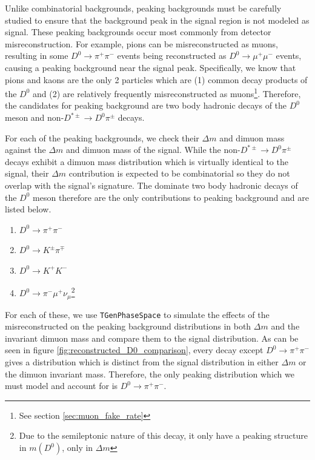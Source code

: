 Unlike combinatorial backgrounds, peaking backgrounds must be carefully studied to ensure that the background peak in the signal region is not modeled as signal. These peaking backgrounds occur most commonly from detector misreconstruction. For example, pions can be misreconstructed as muons, resulting in some $D^0 \to \pi^+ \pi^-$ events being reconstructed as $D^0 \to \mu^+ \mu^-$ events, causing a peaking background near the signal peak. Specifically, we know that pions and kaons are the only 2 particles which are (1) common decay products of the $D^0$ and (2) are relatively frequently misreconstructed as muons\footnote{See section \ref{sec:muon_fake_rate}}. Therefore, the candidates for peaking background are two body hadronic decays of the $D^0$ meson and non-$D^{*\pm} \to D^0 \pi^\pm$ decays. 

For each of the peaking backgrounds, we check their $\Delta m$ and dimuon mass against the $\Delta m$ and dimuon mass of the signal. While the non-$D^{*\pm} \to D^0 \pi^\pm$ decays exhibit a dimuon mass distribution which is virtually identical to the signal, their $\Delta m$ contribution is expected to be combinatorial so they do not overlap with the signal's signature. The dominate two body hadronic decays of the $D^0$ meson therefore are the only contributions to peaking background and are listed below.
\begin{enumerate}
    \item $D^0 \to \pi^+ \pi^-$
    \item $D^0 \to K^\pm \pi^\mp$
    \item $D^0 \to K^+ K^-$
    \item $D^0 \to \pi^- \mu^+ \nu_\mu$\footnote{Due to the semileptonic nature of this decay, it only have a peaking structure in $m(D^0)$, only in $\Delta m$}
\end{enumerate}
For each of these, we use \texttt{TGenPhaseSpace} to simulate the effects of the misreconstructed on the peaking background distributions in both $\Delta m$ and the invariant dimuon mass and compare them to the signal distribution. As can be seen in figure \ref{fig:reconstructed_D0_comparison}, every decay except $D^0 \to \pi^+ \pi^-$ gives a distribution which is distinct from the signal distribution in either $\Delta m$ or the dimuon invariant mass. Therefore, the only peaking distribution which we must model and account for is $D^0 \to \pi^+ \pi^-$. 

